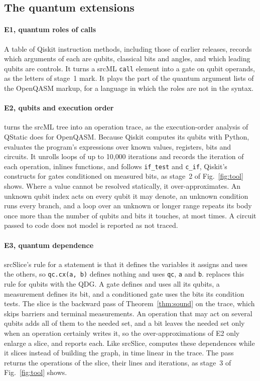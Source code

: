 \subsection{The quantum extensions}

\paragraph*{E1, quantum roles of calls}
A table of \numToolGateTable{} Qiskit instruction methods, including those of earlier releases, records
which arguments of each are qubits, classical bits and angles, and which leading qubits are controls. It
turns a srcML \texttt{call} element into a gate on qubit operands, as the letters of stage~1 mark. It plays
the part of the quantum argument lists of the OpenQASM markup, for a language in which the roles are not in
the syntax.

\paragraph*{E2, qubits and execution order}
\tool{} turns the srcML tree into an operation trace, as the execution-order analysis of QStatic does for
OpenQASM. Because Qiskit computes its qubits with Python, \tool{} evaluates the
program's expressions over known values, registers, bits and circuits. It unrolls loops of up to 10{,}000 iterations and records the
iteration of each operation, inlines functions, and follows \texttt{if\_test} and \texttt{c\_if}, Qiskit's
constructs for gates conditioned on measured bits, as stage~2 of Fig.~\ref{fig:tool} shows. Where a value
cannot be resolved statically, it over-approximates. An unknown qubit index acts on every qubit it may
denote, an unknown condition runs every branch, and a loop over an unknown or longer range repeats its body once
more than the number of qubits and bits it touches, at most \numToolMaxCopies{} times. A circuit passed to code
\tool{} does not model is reported as not traced.

\paragraph*{E3, quantum dependence}
srcSlice's rule for a statement is that it defines the variables it assigns and uses the others, so
\texttt{qc.cx(a, b)} defines nothing and uses \texttt{qc}, \texttt{a} and \texttt{b}. \tool{} replaces this
rule for qubits with the QDG. A gate defines and uses all its qubits, a measurement defines its bit, and a
conditioned gate uses the bits its condition tests. The slice is the backward pass of
Theorem~\ref{thm:sound} on the trace, which skips barriers and terminal measurements. An operation that
may act on several qubits adds all of them to the needed set, and a bit leaves the needed set only when an
operation certainly writes it, so the over-approximations of E2 only enlarge a slice, and \tool{} reports
each. Like srcSlice, \tool{} computes these dependences while it slices instead of building the graph, in
time linear in the trace. The pass returns the operations of the slice, their lines and iterations, as
stage~3 of Fig.~\ref{fig:tool} shows.

